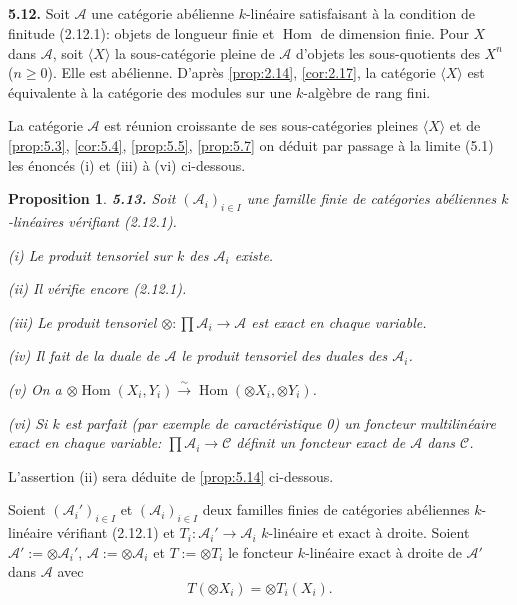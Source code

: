 \documentclass[12pt,a4paper]{article}
\theoremstyle{plain}
\newtheorem{proposition}[theorem]{Proposition}
\theoremstyle{definition}
\theoremstyle{remark}
\DeclareMathOperator{\Hom}{Hom}
\begin{document}
\subsection{}

\textbf{5.12.} Soit $\mathcal{A}$ une catégorie abélienne $k$-linéaire satisfaisant à la condition de finitude (2.12.1): objets de longueur finie et $\Hom$ de dimension finie. Pour $X$ dans $\mathcal{A}$, soit $\langle X \rangle$ la sous-catégorie pleine de $\mathcal{A}$ d'objets les sous-quotients des $X^n$ ($n \geq 0$). Elle est abélienne. D'après \ref{prop:2.14}, \ref{cor:2.17}, la catégorie $\langle X \rangle$ est équivalente à la catégorie des modules sur une $k$-algèbre de rang fini.

La catégorie $\mathcal{A}$ est réunion croissante de ses sous-catégories pleines $\langle X \rangle$ et de \ref{prop:5.3}, \ref{cor:5.4}, \ref{prop:5.5}, \ref{prop:5.7} on déduit par passage à la limite (5.1) les énoncés (i) et (iii) à (vi) ci-dessous.

\begin{proposition}\label{prop:5.13}
\textbf{5.13.} Soit $(\mathcal{A}_i)_{i \in I}$ une famille finie de catégories abéliennes $k$-linéaires vérifiant (2.12.1).

(i) Le produit tensoriel sur $k$ des $\mathcal{A}_i$ existe.

(ii) Il vérifie encore (2.12.1).

(iii) Le produit tensoriel $\otimes : \prod \mathcal{A}_i \to \mathcal{A}$ est exact en chaque variable.

(iv) Il fait de la duale de $\mathcal{A}$ le produit tensoriel des duales des $\mathcal{A}_i$.

(v) On a $\otimes \Hom(X_i, Y_i) \xrightarrow{\sim} \Hom(\otimes X_i, \otimes Y_i)$.

(vi) Si $k$ est parfait (par exemple de caractéristique 0) un foncteur multilinéaire exact en chaque variable: $\prod \mathcal{A}_i \to \mathcal{C}$ définit un foncteur exact de $\mathcal{A}$ dans $\mathcal{C}$.
\end{proposition}

L'assertion (ii) sera déduite de \ref{prop:5.14} ci-dessous.

Soient $(\mathcal{A}_i')_{i \in I}$ et $(\mathcal{A}_i)_{i \in I}$ deux familles finies de catégories abéliennes $k$-linéaire vérifiant (2.12.1) et $T_i : \mathcal{A}_i' \to \mathcal{A}_i$ $k$-linéaire et exact à droite. Soient $\mathcal{A}' := \otimes \mathcal{A}_i'$, $\mathcal{A} := \otimes \mathcal{A}_i$ et $T := \otimes T_i$ le foncteur $k$-linéaire exact à droite de $\mathcal{A}'$ dans $\mathcal{A}$ avec
\[
T(\otimes X_i) = \otimes T_i(X_i).
\]
\end{document}
